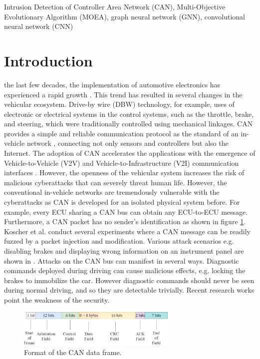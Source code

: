 \documentclass[lettersize,journal]{IEEEtran}
\begin{document}
\begin{IEEEkeywords}
Intrusion Detection of Controller Area Network (CAN), Multi-Objective Evolutionary Algorithm (MOEA), graph neural network (GNN), convolutional neural network (CNN)
\end{IEEEkeywords}

\section{Introduction}
 the last few decades, the implementation of automotive electronics has experienced a rapid growth \cite{1}. This trend has resulted in several changes in the vehicular ecosystem. Drive-by wire (DBW) technology, for example, uses of electronic or electrical systems in the control systems, such as the throttle, brake, and steering, which were traditionally controlled using mechanical linkages. CAN provides a simple and reliable communication protocol as the standard of an in-vehicle network \cite{2}, connecting not only sensors and controllers but also the Internet. The adoption of CAN accelerates the applications with the emergence of Vehicle-to-Vehicle (V2V) and Vehicle-to-Infrastructure (V2I) communication interfaces \cite{3}. However, the openness of the vehicular system increases the risk of malicious cyberattacks that can severely threat human life. However, the conventional in-vehicle networks are tremendously vulnerable with the cyberattacks as CAN is developed for an isolated physical system before. For example, every ECU sharing a CAN bus can obtain any ECU-to-ECU message. Furthermore, a CAN packet has no sender’s identification as shown in figure \ref{fig_1}. Koscher et al. \cite{4} conduct several experiments where a CAN message can be readily fuzzed by a packet injection and modification. Various attack scenarios e.g. disabling brakes and displaying wrong information on an instrument panel are shown in \cite{5, 6}. Attacks on the CAN bus can manifest in several ways. Diagnostic commands deployed during driving can cause malicious effects, e.g. locking the brakes to immobilize the car. However diagnostic commands should never be seen during normal driving, and so they are detectable trivially. Recent research works point the weakness of the security. 

\begin{figure}[!t]
\centering
\includegraphics[width=3in]{CAN}
\caption{Format of the CAN data frame.}
\label{fig_1}
\end{figure}
\end{document}
